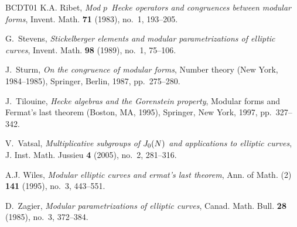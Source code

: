 \documentclass[10pt,twoside]{article}
\theoremstyle{definition}
\begin{document}
\begin{thebibliography}{BCDT01}
K.\thinspace{}A. Ribet, \emph{Mod $p$\ {H}ecke operators and congruences
  between modular forms}, Invent. Math. \textbf{71} (1983), no.~1, 193--205. 


G.~Stevens, \emph{Stickelberger elements and modular parametrizations of
  elliptic curves}, Invent. Math. \textbf{98} (1989), no.~1, 75--106.


J.~Sturm, \emph{On the congruence of modular forms}, Number theory (New York,
  1984--1985), Springer, Berlin, 1987, pp.~275--280.

J.~Tilouine, \emph{Hecke algebras and the {G}orenstein property}, Modular
  forms and Fermat's last theorem (Boston, MA, 1995), Springer, New York, 1997,
  pp.~327--342.


V.~Vatsal, \emph{Multiplicative subgroups of {$J\sb 0(N)$} and applications to
  elliptic curves}, J. Inst. Math. Jussieu \textbf{4} (2005), no.~2, 281--316.

A.\thinspace{}J. Wiles, \emph{Modular elliptic curves and ermat's
  last theorem}, Ann. of Math. (2) \textbf{141} (1995), no.~3, 443--551. 

D.~Zagier, \emph{Modular parametrizations of elliptic curves}, Canad. Math. 
 Bull. \textbf{28} (1985), no.~3, 372--384. 

\end{thebibliography}
\end{document}
